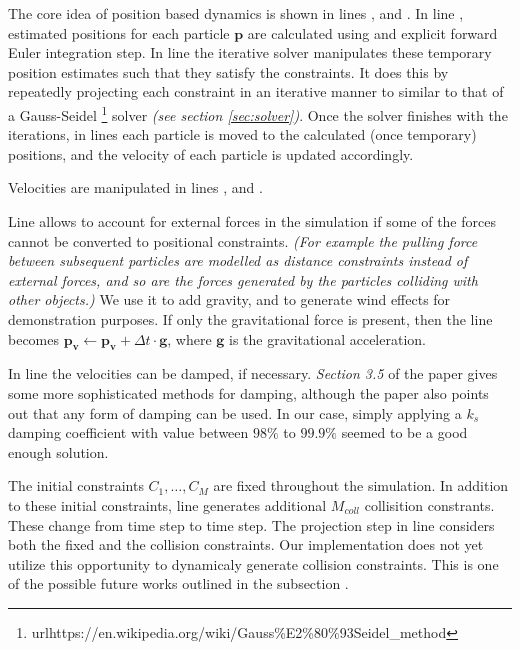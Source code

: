 \documentclass[sigplan,screen,nonacm]{acmart}
\renewcommand{\b}{\boldsymbol}
\begin{document}
The core idea of position based dynamics is shown in lines ,
 and . In line , estimated
positions for each particle $\b{p}$ are calculated using and explicit forward
Euler integration step. In line  the iterative solver manipulates
these temporary position estimates such that they satisfy the constraints. It
does this by repeatedly projecting each constraint in an iterative manner to
similar to that of a Gauss-Seidel
\footnote{url{https://en.wikipedia.org/wiki/Gauss\%E2\%80\%93Seidel\_method}}
solver \emph{(see section \ref{sec:solver})}. Once the solver finishes with the
iterations, in lines  each particle is moved to the calculated
(once temporary) positions, and the velocity of each particle is updated
accordingly.

Velocities are manipulated in lines ,  and
. 

Line  allows to account for external forces
in the simulation if some of the forces cannot be converted to positional
constraints. \emph{(For example the pulling force between subsequent particles
are modelled as distance constraints instead of external forces, and so are the
forces generated by the particles colliding with other objects.)} We use it to
add gravity, and to generate wind effects for demonstration purposes. If only
the gravitational force is present, then the line becomes $\b{p_v} \gets \b{p_v}
+ \Delta t \cdot \b{g}$, where $\b{g}$ is the gravitational acceleration.

In line  the velocities can be damped, if necessary. \emph{Section
3.5} of the \citet{MullerPBD} paper gives some more sophisticated methods for
damping, although the paper also points out that any form of damping can be
used. In our case, simply applying a $k_s$ damping coefficient with value
between $98\%$ to $99.9\%$ seemed to be a good enough solution.

The initial constraints $C_1, \ldots, C_M$ are fixed throughout the simulation.
In addition to these initial constraints, line  generates additional
$M_{coll}$ collisition constrants. These change from time step to time step. The
projection step in line  considers both the fixed and the
collision constraints. Our implementation does not yet utilize this opportunity
to dynamicaly generate collision constraints. This is one of the possible future
works outlined in the subsection .
\end{document}

